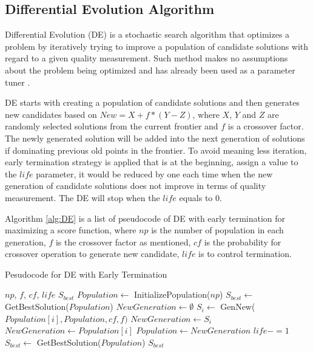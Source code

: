 \documentclass{acm_proc_article-sp}
\begin{document}
\subsection{Differential Evolution Algorithm}
Differential Evolution (DE)\cite{storn1997differential} is a stochastic search algorithm that 
optimizes a problem by iteratively trying to improve a  population of candidate solutions with 
regard to a given quality measurement. Such method makes no assumptions about the 
problem being optimized and has already been used as a parameter tuner
\cite{omran2005differential, chiha2012tuning}.

DE starts with creating a population of candidate solutions and then generates new 
candidates based on $New = X+f*(Y-Z)$, where $X$, $Y$ and $Z$ are randomly selected 
solutions from the current frontier and $f$ is a crossover factor. The newly generated solution 
will be added into the next generation of solutions if dominating previous old points in the 
frontier. To avoid meaning less iteration, early termination strategy is applied that is at the 
beginning, assign a value to the $life$ parameter, it would be reduced by one each time   
when the new generation of candidate solutions does not improve in terms of quality 
measurement. The DE will stop when the $life$ equals to 0.

Algorithm \ref{alg:DE} is a list of pseudocode of DE with early termination for maximizing a 
score function, where $np$ is the number of population in each generation, $f$ is the 
crossover factor as mentioned, $cf$ is the probability for crossover operation to generate new 
candidate, $life$ is to control termination.

\begin{algorithm}
	\caption{Pesudocode for DE with Early Termination}
	\label{alg:DE}
		\begin{algorithmic}[1]
			\Require $np$, $f$, $cf$, $life$
			\Ensure $S_{best}$
		  \State $Population  \gets $ InitializePopulation($np$)
		  \State $S_{best} \gets $GetBestSolution($Population $)
			\State $NewGeneration \gets \emptyset$
				\State $S_i \gets$ GenNew($Population [i], Population , cf, f)$
				 	\State $NewGeneration \gets S_i$
				\Else
					\State $NewGeneration \gets Population [i]$
				\EndIf
			\EndFor
			\State $Population  \gets NewGeneration$
				\State $life -=1$
			\EndIf
			\State $S_{best} \gets$ GetBestSolution($Population $)
		  \EndWhile
		 \State \Return $S_{best}$
                 \end{algorithmic}            
\end{algorithm}
\end{document}
